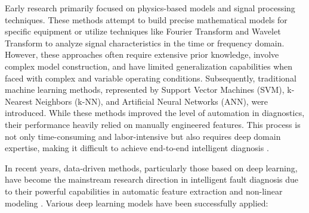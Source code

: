 Early research primarily focused on physics-based models and signal processing techniques. These methods attempt to build precise mathematical models for specific equipment or utilize techniques like Fourier Transform and Wavelet Transform to analyze signal characteristics in the time or frequency domain. However, these approaches often require extensive prior knowledge, involve complex model construction, and have limited generalization capabilities when faced with complex and variable operating conditions. Subsequently, traditional machine learning methods, represented by Support Vector Machines (SVM), k-Nearest Neighbors (k-NN), and Artificial Neural Networks (ANN), were introduced. While these methods improved the level of automation in diagnostics, their performance heavily relied on manually engineered features. This process is not only time-consuming and labor-intensive but also requires deep domain expertise, making it difficult to achieve end-to-end intelligent diagnosis \cite{lei2020applications}.

In recent years, data-driven methods, particularly those based on deep learning, have become the mainstream research direction in intelligent fault diagnosis due to their powerful capabilities in automatic feature extraction and non-linear modeling \cite{zhao2019deep, zhang2019deep}. Various deep learning models have been successfully applied:

